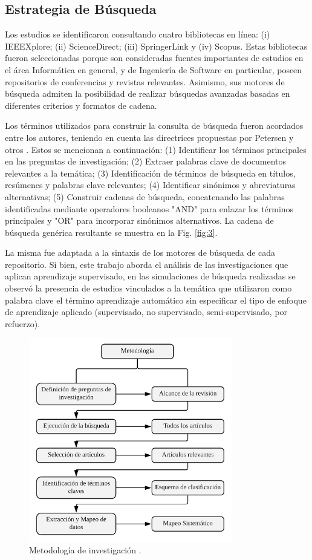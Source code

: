 \documentclass[journal]{IEEEtran}
\begin{document}
\subsection{Estrategia de Búsqueda}

Los estudios se identificaron consultando cuatro bibliotecas en línea: (i) IEEEXplore; (ii) ScienceDirect; (iii) SpringerLink y (iv) Scopus. Estas bibliotecas fueron seleccionadas porque son consideradas fuentes importantes de estudios en el área Informática en general, y de Ingeniería de Software en particular, poseen repositorios de conferencias y revistas relevantes. Asimismo, sus motores de búsqueda admiten la posibilidad de realizar búsquedas avanzadas basadas en diferentes criterios y formatos de cadena.

Los términos utilizados para construir la consulta de búsqueda fueron acordados entre los autores, teniendo en cuenta las directrices propuestas por Petersen y otros \cite{petersen2008systematic}. Estos se mencionan a continuación: (1) Identificar los términos principales en las preguntas de investigación; (2) Extraer palabras clave de documentos relevantes a la temática; (3) Identificación de términos de búsqueda en títulos, resúmenes y palabras clave relevantes; (4) Identificar sinónimos y abreviaturas alternativas; (5) Construir cadenas de búsqueda, concatenando las palabras identificadas mediante operadores booleanos "AND" para enlazar los términos principales y "OR" para incorporar sinónimos alternativos. La cadena de búsqueda genérica resultante se muestra en la Fig. \ref{fig:3}.

La misma fue adaptada a la sintaxis de los motores de búsqueda de cada repositorio. Si bien, este trabajo aborda el análisis de las investigaciones que aplican aprendizaje supervisado, en las simulaciones de búsqueda realizadas se observó la presencia de estudios vinculados a la temática que utilizaron como palabra clave el término aprendizaje automático sin especificar el tipo de enfoque de aprendizaje aplicado (supervisado, no supervisado, semi-supervisado, por refuerzo).

\begin{figure}[!t]
\centering
\includegraphics[width=3.5in]{figures/figure2_Guada.png}
\caption{Metodología de investigación \cite{petersen2008systematic}.}
\label{fig:2}
\end{figure}
\end{document}
